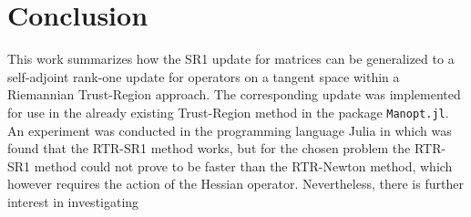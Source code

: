 \chapter{Conclusion}

This work summarizes how the SR1 update for matrices can be generalized to a self-adjoint rank-one update for operators on a tangent space within a Riemannian Trust-Region approach. The corresponding update was implemented for use in the already existing Trust-Region method in the package \lstinline!Manopt.jl!. An experiment was conducted in the programming language Julia in which was found that the RTR-SR1 method works, but for the chosen problem the RTR-SR1 method could not prove to be faster than the RTR-Newton method, which however requires the action of the Hessian operator. Nevertheless, there is further interest in investigating 